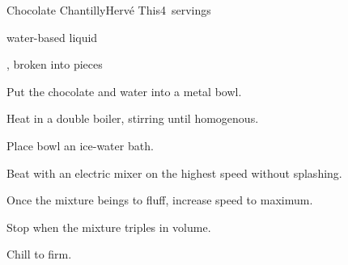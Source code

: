 \begin{recipe}{Chocolate Chantilly}{Hervé This}{4~servings}

\begin{ingredients}
\item {} water-based liquid
\item {} , broken into pieces
\end{ingredients}

\begin{directions}
\item Put the chocolate and water into a metal bowl.
\item Heat in a double boiler, stirring until homogenous.
\item Place bowl an ice-water bath.
\item Beat with an electric mixer on the highest speed without splashing.
\item Once the mixture beings to fluff, increase speed to maximum.
\item Stop when the mixture triples in volume.
\item Chill to firm.
\end{directions}

\end{recipe}
